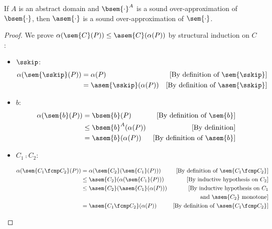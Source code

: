 \begin{theorem}
  \label{thm:sound-ai}
  If $A$ is an abstract domain and $\bsem{\cdot}^A$ is a sound 
  over-approximation of $\bsem{\cdot}$, then $\asem{\cdot}$ is a sound 
  over-approximation of $\sem{\cdot}$.
\end{theorem}
\begin{proof}
  We prove $\alpha(\sem{C}(P)) \leq \asem{C}(\alpha(P))$ by structural
  induction on $C$:

  \begin{itemize}
    \item $\sskip$:
      \begin{align*}
        \alpha(\sem{\sskip}(P))
          &= \alpha(P)
          & \text{[By definition of $\sem{\sskip}$]}\\
          &= \asem{\sskip}(\alpha(P)) 
          & \text{[By definition of $\asem{\sskip}$]}\\
      \end{align*}

    \item $b$:
      \begin{align*}
        \alpha(\sem{b}(P))
          &= \bsem{b}(P)
          & \text{[By definition of $\sem{b}$]}\\
          &\leq \bsem{b}^A(\alpha(P))
          & \text{[By definition]}\\
          &= \asem{b}(\alpha(P)) 
          & \text{[By definition of $\asem{b}$]}\\
      \end{align*}

    \item $C_1 \fcmp C_2$:

      \begin{align*}
        \alpha(\sem{C_1 \fcmp C_2}(P))
          &= \alpha(\sem{C_2}(\sem{C_1}(P)))
          &\text{[By definition of $\sem{C_1 \fcmp C_2}$]}\\
          &\leq \asem{C_2}(\alpha(\sem{C_1}(P)))
          &\text{[By inductive hypothesis on $C_2$]}\\
          &\leq \asem{C_2}(\asem{C_1}(\alpha(P)))
          &\text{[By inductive hypothesis on $C_1$} \\
          && \text{and $\asem{C_2}$ monotone]}\\
          &= \asem{C_1 \fcmp C_2}(\alpha(P))
          &\text{[By definition of $\asem{C_1 \fcmp C_2}$]}\\
      \end{align*}
  

\end{itemize}
\end{proof}

